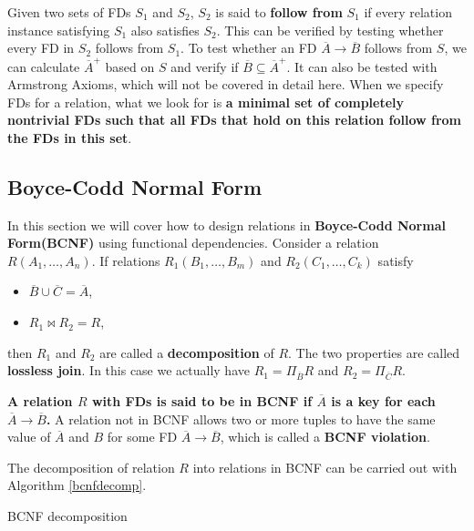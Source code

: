 Given two sets of FDs $S_1$ and $S_2$, $S_2$ is said to \textbf{follow from} $S_1$ if every relation instance satisfying $S_1$ also satisfies $S_2$. This can be verified by testing whether every FD in $S_2$ follows from $S_1$. To test whether an FD $\overline{A}\rightarrow\overline{B}$ follows from $S$, we can calculate $\overline{A}^+$ based on $S$ and verify if $\overline{B}\subseteq\overline{A}^+$. It can also be tested with Armstrong Axioms, which will not be covered in detail here. When we specify FDs for a relation, what we look for is \textbf{a minimal set of completely nontrivial FDs such that all FDs that hold on this relation follow from the FDs in this set}.
\subsection{Boyce-Codd Normal Form}
In this section we will cover how to design relations in \textbf{Boyce-Codd Normal Form(BCNF)} using functional dependencies. Consider a relation $R(A_1,\dots,A_n)$. If relations $R_1(B_1,\dots,B_m)$ and $R_2(C_1,\allowbreak\dots,C_k)$ satisfy
\begin{itemize}
\item $\overline{B}\cup\overline{C}=\overline{A}$,
\item $R_1\bowtie R_2=R$,
\end{itemize}
then $R_1$ and $R_2$ are called a \textbf{decomposition} of $R$. The two properties are called \textbf{lossless join}. In this case we actually have $R_1 = \Pi_{\overline{B}}R$ and $R_2 = \Pi_{\overline{C}}R$.

\textbf{A relation $R$ with FDs is said to be in BCNF if $\overline{A}$ is a key for each $\overline{A}\rightarrow\overline{B}$.} A relation not in BCNF allows two or more tuples to have the same value of $\overline{A}$ and $B$ for some FD $\overline{A}\rightarrow\overline{B}$, which is called a \textbf{BCNF violation}.

The decomposition of relation $R$ into relations in BCNF can be carried out with Algorithm \eqref{bcnfdecomp}.
\begin{algorithm}[ht]
\caption{BCNF decomposition}\label{bcnfdecomp}
\begin{algorithmic}[1]
\Input{}
\Output{}
\Repeat
\end{algorithmic}
\end{algorithm}

